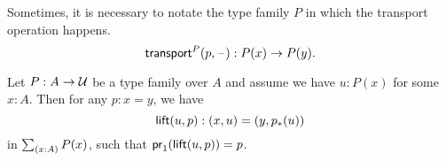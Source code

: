 \documentclass[hott-all.tex]{subfiles}
\begin{document}
%
%
Sometimes, it is necessary to notate the type family $P$ in which the transport operation happens.
\[\mathsf{transport}^{P}(p,\mathord{\hspace{1pt}\text{--}\hspace{1pt}}) : P(x) \to P(y).\]
%
%

\begin{lem}\label{thm:path-lifting}
  Let $P:A\to\mathcal{U}$ be a type family over $A$ and assume we have $u:P(x)$ for some $x:A$.
  Then for any $p:x=y$, we have
  \begin{equation*}
    \mathsf{lift}(u,p):(x,u)=(y,{p}_{*}\mathopen{}\left({u}\right)\mathclose{})
  \end{equation*}
  in $\sm{x:A}P(x)$, such that ${\mathsf{pr}_{1}}\mathopen{}\left({\mathsf{lift}(u,p)}\right)\mathclose{} = p$.
\end{lem}
\end{document}
